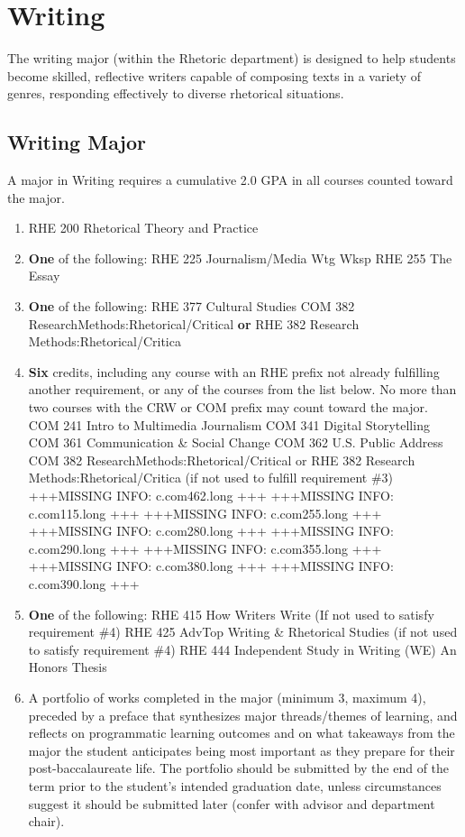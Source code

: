 \documentclass[
  letterpaper,
]{scrbook}
\begin{document}
\hypertarget{writing}{%
\section{Writing}\label{writing}}

The writing major (within the Rhetoric department) is designed to help
students become skilled, reflective writers capable of composing texts
in a variety of genres, responding effectively to diverse rhetorical
situations.

\hypertarget{writing-major}{%
\subsection{Writing Major}\label{writing-major}}

A major in Writing requires a cumulative 2.0 GPA in all courses counted
toward the major.

\begin{enumerate}
\def\labelenumi{\arabic{enumi}.}
\item
  RHE 200 Rhetorical Theory and Practice
\item
  \textbf{One} of the following: RHE 225 Journalism/Media Wtg Wksp RHE
  255 The Essay
\item
  \textbf{One} of the following: RHE 377 Cultural Studies COM 382
  ResearchMethods:Rhetorical/Critical \textbf{or} RHE 382 Research
  Methods:Rhetorical/Critica
\item
  \textbf{Six} credits, including any course with an RHE prefix not
  already fulfilling another requirement, or any of the courses from the
  list below. No more than two courses with the CRW or COM prefix may
  count toward the major. COM 241 Intro to Multimedia Journalism COM 341
  Digital Storytelling COM 361 Communication \& Social Change COM 362
  U.S. Public Address COM 382 ResearchMethods:Rhetorical/Critical or RHE
  382 Research Methods:Rhetorical/Critica (if not used to fulfill
  requirement \#3) +++MISSING INFO: c.com462.long +++ +++MISSING INFO:
  c.com115.long +++ +++MISSING INFO: c.com255.long +++ +++MISSING INFO:
  c.com280.long +++ +++MISSING INFO: c.com290.long +++ +++MISSING INFO:
  c.com355.long +++ +++MISSING INFO: c.com380.long +++ +++MISSING INFO:
  c.com390.long +++
\item
  \textbf{One} of the following: RHE 415 How Writers Write (If not used
  to satisfy requirement \#4) RHE 425 AdvTop Writing \& Rhetorical
  Studies (if not used to satisfy requirement \#4) RHE 444 Independent
  Study in Writing (WE) An Honors Thesis
\item
  A portfolio of works completed in the major (minimum 3, maximum 4),
  preceded by a preface that synthesizes major threads/themes of
  learning, and reflects on programmatic learning outcomes and on what
  takeaways from the major the student anticipates being most important
  as they prepare for their post-baccalaureate life. The portfolio
  should be submitted by the end of the term prior to the student's
  intended graduation date, unless circumstances suggest it should be
  submitted later (confer with advisor and department chair).
\end{enumerate}
\end{document}
